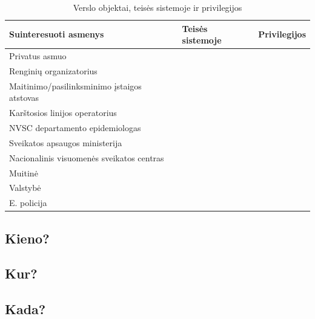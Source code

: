 \documentclass{VUMIFPSkursinis}
\begin{document}
\begin{center}
	\small
	\begin{longtable}{|L{3cm}|C{5cm}|C{7cm}|}
		\caption{Verslo objektai, teisės sistemoje ir privilegijos}
		\label{table:EmployeeSalary}
		\\ \hline
		Suinteresuoti asmenys &
		Teisės sistemoje   &										
		Privilegijos \\ \hline
		Privatus asmuo &
		&
		\\ \hline
		Renginių organizatorius &
		&
		\\ \hline		
		Maitinimo/pasilinksminimo įstaigos atstovas &
		&
		\\ \hline	
		Karštosios linijos operatorius &
		&
		\\ \hline	
		NVSC departamento epidemiologas &
		&
		\\ \hline	
		Sveikatos apsaugos ministerija &
		&
		\\ \hline	
		Nacionalinis visuomenės sveikatos centras &
		&
		\\ \hline	
		Muitinė &
		&
		\\ \hline	
		Valstybė &
		&
		\\ \hline	
		E. policija &
		&
		\\ \hline																	
\end{longtable}
\end{center}

\subsection{Kieno?}

\subsection{Kur?}

\subsection{Kada?}
\end{document}
